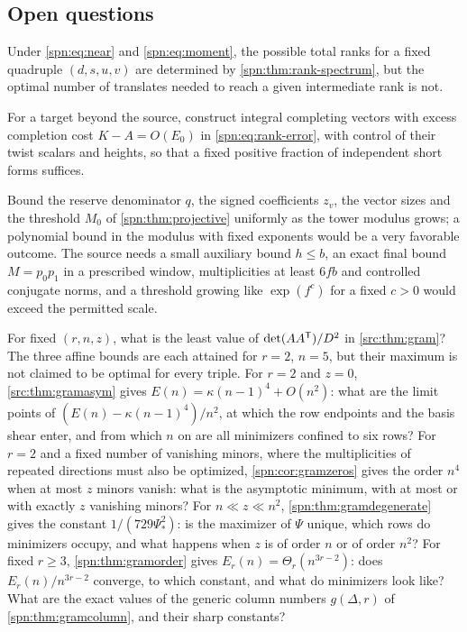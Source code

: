 \subsection{Open questions}\label{spn:sec:open}

\begin{question}\label{spn:q:selection}
Under \eqref{spn:eq:near} and \eqref{spn:eq:moment}, the possible total ranks for a fixed quadruple
$(d,s,u,v)$ are determined by \cref{spn:thm:rank-spectrum}, but the optimal number of translates
needed to reach a given intermediate rank is not.
\end{question}

\begin{question}\label{spn:q:completion}
For a target beyond the source, construct integral completing vectors with
excess completion cost $K-A=O(E_0)$ in \eqref{spn:eq:rank-error}, with control
of their twist scalars and heights, so that a fixed positive fraction of
independent short forms suffices.
\end{question}

\begin{question}\label{spn:q:frames}
Bound the reserve denominator $q$, the signed coefficients $z_v$, the vector
sizes and the threshold $M_0$ of \cref{spn:thm:projective} uniformly as the
tower modulus grows; a polynomial bound in the modulus with fixed exponents
would be a very favorable outcome. The source needs a small auxiliary bound
$h\le b$, an exact final bound $M=p_0p_1$ in a prescribed window,
multiplicities at least $6fb$ and controlled conjugate norms, and a threshold
growing like $\exp(f^{c})$ for a fixed $c>0$ would exceed the permitted
scale.
\end{question}

\begin{question}\label{src:q:gram}
For fixed $(r,n,z)$, what is the least value of $\det(AA^{\mathsf{T}})/D^2$ in
\cref{src:thm:gram}? The three affine bounds are each attained for $r=2$, $n=5$, but their
maximum is not claimed to be optimal for every triple. For $r=2$ and $z=0$,
\cref{src:thm:gramasym} gives $E(n)=\kappa(n-1)^4+O(n^2)$: what are the limit points of
$(E(n)-\kappa(n-1)^4)/n^2$, at which the row endpoints and the basis shear enter, and from which $n$
on are all minimizers confined to six rows? For $r=2$ and a fixed number of vanishing minors, where
the multiplicities of repeated directions must also be optimized, \cref{spn:cor:gramzeros} gives the
order $n^4$ when at most $z$ minors vanish: what is the asymptotic minimum, with at most or with exactly
$z$ vanishing minors? For $n\ll z\ll n^2$, \cref{spn:thm:gramdegenerate} gives the constant
$1/(729\Psi_*^2)$: is the maximizer of $\Psi$ unique, which rows do minimizers occupy, and what happens
when $z$ is of order $n$ or of order $n^2$? For fixed $r\ge3$, \cref{spn:thm:gramorder} gives
$E_r(n)=\Theta_r(n^{3r-2})$: does $E_r(n)/n^{3r-2}$ converge, to which constant, and what do minimizers
look like? What are the exact values of the generic column numbers $g(\Delta,r)$ of
\cref{spn:thm:gramcolumn}, and their sharp constants?
\end{question}
